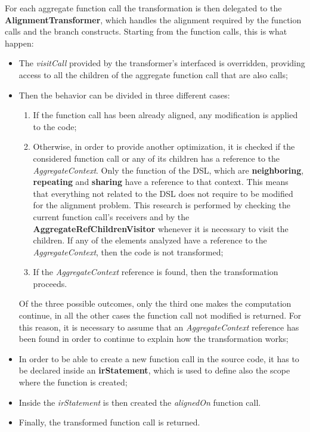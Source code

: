 For each aggregate function call the transformation is then delegated to the \textbf{AlignmentTransformer}, which handles the alignment required by the function calls and the branch constructs.\newline
Starting from the function calls, this is what happen:
\begin{itemize}
    \item The \textit{visitCall} provided by the transformer's interfaced is overridden, providing access to all the children of the aggregate function call that are also calls;
    \item Then the behavior can be divided in three different cases:
    \begin{enumerate}
        \item If the function call has been already aligned, any modification is applied to the code;
        \item Otherwise, in order to provide another optimization, it is checked if the considered function call or any of its children has a reference to the \textit{AggregateContext}. Only the function of the DSL, which are \textbf{neighboring}, \textbf{repeating} and \textbf{sharing} have a reference to that context. This means that everything not related to the DSL does not require to be modified for the alignment problem. This research is performed by checking the current function call's receivers and by the \textbf{AggregateRefChildrenVisitor} whenever it is necessary to visit the children.\newline
        If any of the elements analyzed have a reference to the \textit{AggregateContext}, then the code is not transformed;
        \item If the \textit{AggregateContext} reference is found, then the transformation proceeds. 
    \end{enumerate}
    Of the three possible outcomes, only the third one makes the computation continue, in all the other cases the function call not modified is returned. For this reason, it is necessary to assume that an \textit{AggregateContext} reference has been found in order to continue to explain how the transformation works;
    \item In order to be able to create a new function call in the source code, it has to be declared inside an \textbf{irStatement}, which is used to define also the scope where the function is created;
    \item Inside the \textit{irStatement} is then created the \textit{alignedOn} function call.
    \item Finally, the transformed function call is returned.
\end{itemize}

